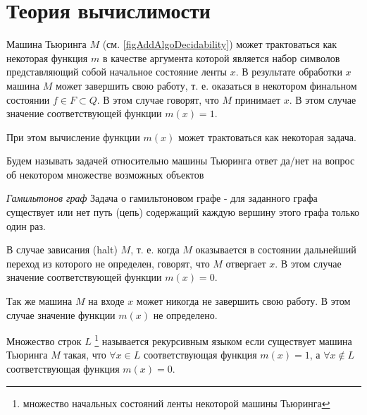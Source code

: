 \section{Теория вычислимости}

Машина Тьюринга $M$ (см. \autoref{figAddAlgoDecidability}) может
трактоваться как некоторая функция $m$ в качестве 
аргумента которой является набор символов представляющий собой
начальное состояние ленты $x$. В результате обработки $x$ машина $M$
может завершить свою работу, т. е. оказаться в некотором финальном
состоянии $f \in F \subset Q$. В этом случае говорят, что $M$
принимает $x$. В этом случае значение соответствующей функции 
$m(x) = 1$. 

При этом вычисление функции $m(x)$ может трактоваться как некоторая
задача.  
\begin{definition}[Задача]
Будем называть задачей относительно машины Тьюринга ответ да/нет на
вопрос об некотором множестве возможных объектов
\end{definition}

\begin{example}
\emph{Гамильтонов граф}
Задача о гамильтоновом графе - для заданного графа существует или нет
путь (цепь) содержащий каждую вершину этого графа только один раз.
\nonumber
\end{example}




В случае зависания (halt) $M$, т. е. когда $M$
оказывается в состоянии дальнейший переход из которого не определен,
говорят, что $M$ отвергает $x$. В этом случае значение соответствующей
функции $m(x) =0$. 

Так же машина $M$ на входе $x$ может никогда не
завершить свою работу. В этом случае значение функции $m(x)$
не определено.    

\begin{definition}
Множество строк $L$
\footnote{множество начальных состояний ленты некоторой
машины Тьюринга}
называется рекурсивным языком если существует машина Тьюринга $M$
такая, что $\forall x \in L$ соответствующая функция $m(x) = 1$, а 
$\forall x \notin L$ соответствующая функция $m(x) = 0$. 
\end{definition}

